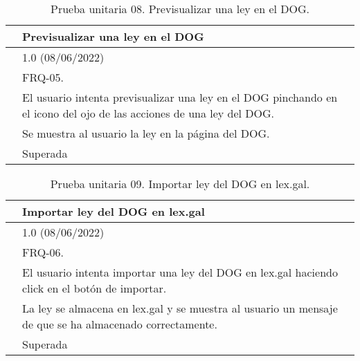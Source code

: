 \begin{table}[H]
\begin{center}
\begin{tabular}{|p{3cm}|p{10cm}|} \hline
\centering {\bf PU-08} & Previsualizar una ley en el DOG  \\ \hline\hline
\centering {\bf Versión} & 1.0 (08/06/2022) \\ \hline
\centering {\bf Dependencias} & FRQ-05. \\ \hline
\centering {\bf Descripción} &  El usuario intenta previsualizar una ley en el DOG pinchando en el icono del ojo de las acciones de una ley del DOG. \\ \hline
\centering {\bf Criterio de aceptación} & Se muestra al usuario la ley en la página del DOG. \\ \hline
\centering {\bf Estado} & Superada \\ \hline
\end{tabular}
\caption{Prueba unitaria 08. Previsualizar una ley en el DOG.}
\label{enlacePU8}
\end{center}
\end{table}

\begin{table}[H]
\begin{center}
\begin{tabular}{|p{3cm}|p{10cm}|} \hline
\centering {\bf PU-09} & Importar ley del DOG en lex.gal  \\ \hline\hline
\centering {\bf Versión} & 1.0 (08/06/2022) \\ \hline
\centering {\bf Dependencias} & FRQ-06. \\ \hline
\centering {\bf Descripción} &  El usuario intenta importar una ley del DOG en lex.gal haciendo click en el botón de importar. \\ \hline
\centering {\bf Criterio de aceptación} & La ley se almacena en lex.gal y se muestra al usuario un mensaje de que se ha almacenado correctamente. \\ \hline
\centering {\bf Estado} & Superada \\ \hline
\end{tabular}
\caption{Prueba unitaria 09. Importar ley del DOG en lex.gal.}
\label{enlacePU9}
\end{center}
\end{table}

